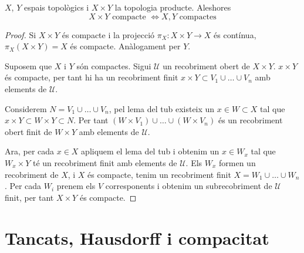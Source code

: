 \begin{prop}
    $X$, $Y$ espais topològics i $X \times Y$ la topologia producte. Aleshores
    \[X \times Y \text{ compacte } \Longleftrightarrow X,Y \text{ compactes}\]
\end{prop}
\begin{proof}
    Si $X \times Y$ és compacte i la projecció $\pi_X\!: X \times Y \rightarrow X$ és contínua, $\pi_X(X\times Y)=X$ és compacte. Anàlogament per $Y$.
    
    \quad
    
    Suposem que $X$ i $Y$ són compactes. Sigui $\mathcal{U}$ un recobriment obert de $X \times Y$. $x \times Y$ és compacte, per tant hi ha un recobriment finit $x \times Y \subset V_1 \cup\dots\cup V_n$ amb elements de $\mathcal{U}$.
    
    Considerem $N = V_1 \cup\dots\cup V_n$, pel lema del tub existeix un $x \in W \subset X$ tal que $x\times Y \subset W \times Y \subset N$. Per tant $(W \times V_1) \cup\dots\cup (W \times V_n)$ és un recobriment obert finit de $W \times Y$ amb elements de $\mathcal{U}$.
    
    Ara, per cada $x\in X$ apliquem el lema del tub i obtenim un $x \in W_x$ tal que $W_x \times Y$ té un recobriment finit amb elements de $\mathcal{U}$. Els $W_x$ formen un recobriment de $X$, i $X$ és compacte, tenim un recobriment finit $X = W_1 \cup\dots\cup W_n$. Per cada $W_i$ prenem els $V$ corresponents i obtenim un subrecobriment de $\mathcal{U}$ finit, per tant $X\times Y$ és compacte.
    
\end{proof}


\section{Tancats, Hausdorff i compacitat}

